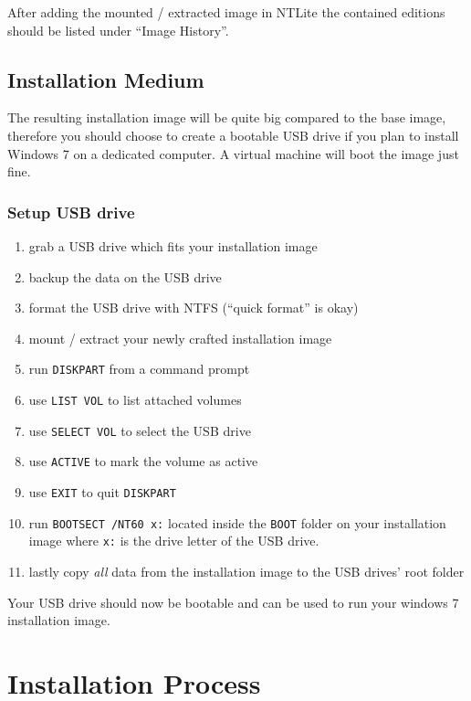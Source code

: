\documentclass{itsarticle}
\begin{document}
After adding the mounted / extracted image in NTLite the contained editions
should be listed under ``Image History''.

\subsection{Installation Medium}
\label{ssec:medium}

The resulting installation image will be quite big compared to the base image,
therefore you should choose to create a bootable USB drive if you plan to
install Windows 7 on a dedicated computer. A virtual machine will boot the
image just fine.

\subsubsection{Setup USB drive}

\begin{enumerate}
    \item grab a USB drive which fits your installation image
    \item backup the data on the USB drive
    \item format the USB drive with NTFS (``quick format'' is okay)
    \item mount / extract your newly crafted installation image
    \item run \texttt{DISKPART} from a command prompt
    \item use \texttt{LIST VOL} to list attached volumes
    \item use \texttt{SELECT VOL} to select the USB drive
    \item use \texttt{ACTIVE} to mark the volume as active
    \item use \texttt{EXIT} to quit \texttt{DISKPART}
    \item run \texttt{BOOTSECT /NT60 x:} located inside the \texttt{BOOT}
        folder on your installation image where \texttt{x:} is the drive letter
        of the USB drive.
    \item lastly copy \emph{all} data from the installation image to the USB
        drives' root folder
\end{enumerate}

Your USB drive should now be bootable and can be used to run your windows 7
installation image.

\section{Installation Process}
\label{sec:installation}
\end{document}
